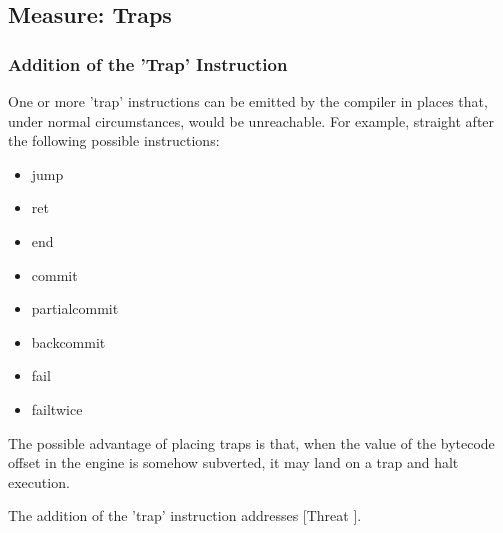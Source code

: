 \subsection{Measure: Traps}
\label{sec:traps}

\subsubsection{Addition of the 'Trap' Instruction}

One or more 'trap' instructions can be emitted by the compiler in places that,
under normal circumstances, would be unreachable. For example, straight
after the following possible instructions:

\begin{itemize}
\item{jump}
\item{ret}
\item{end}
\item{commit}
\item{partialcommit}
\item{backcommit}
\item{fail}
\item{failtwice}
\end{itemize}

The possible advantage of placing traps is that, when the value of the
bytecode offset in the engine is somehow subverted, it may land on a trap
and halt execution.

The addition of the 'trap' instruction addresses [Threat \thethreatbcupset].
